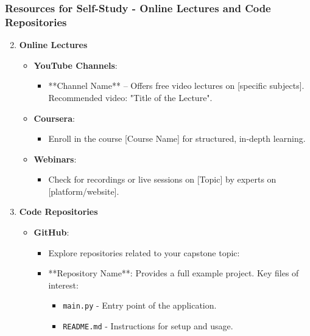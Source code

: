 \documentclass[aspectratio=169]{beamer}
\begin{document}
\begin{frame}[fragile]
    \frametitle{Resources for Self-Study - Online Lectures and Code Repositories}
    \begin{enumerate}
        \setcounter{enumi}{1} %
        \item \textbf{Online Lectures}
        \begin{itemize}
            \item \textbf{YouTube Channels}:
                \begin{itemize}
                    \item **Channel Name** – Offers free video lectures on [specific subjects]. Recommended video: "Title of the Lecture".
                \end{itemize}
            \item \textbf{Coursera}:
                \begin{itemize}
                    \item Enroll in the course [Course Name] for structured, in-depth learning.
                \end{itemize}
            \item \textbf{Webinars}:
                \begin{itemize}
                    \item Check for recordings or live sessions on [Topic] by experts on [platform/website].
                \end{itemize}
        \end{itemize}

        \item \textbf{Code Repositories}
        \begin{itemize}
            \item \textbf{GitHub}:
                \begin{itemize}
                    \item Explore repositories related to your capstone topic:
                    \item **Repository Name**: Provides a full example project. Key files of interest:
                        \begin{itemize}
                            \item \texttt{main.py} - Entry point of the application.
                            \item \texttt{README.md} - Instructions for setup and usage.
                        \end{itemize}
                \end{itemize}
        \end{itemize}
    \end{enumerate}
\end{frame}
\end{document}
